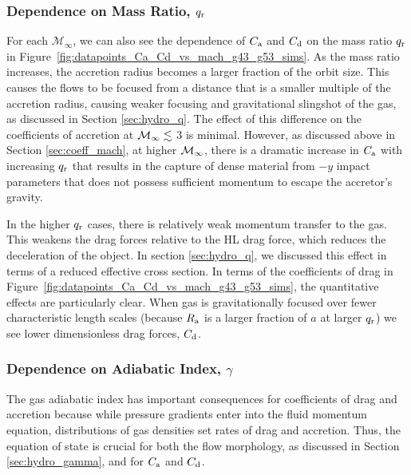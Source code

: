 \subsubsection{Dependence on Mass Ratio, $q_{\rm r}$}\label{sec:coeff_q}

For each $\mathcal{M}_\infty$, we can also see the dependence of $C_{\rm a}$ and $C_{\rm d}$ on the mass ratio $q_{\rm r}$ in Figure~\ref{fig:datapoints_Ca_Cd_vs_mach_g43_g53_sims}. As the mass ratio increases, the accretion radius becomes a larger fraction of the orbit size. This causes the flows to be focused from a distance that is a smaller multiple of the accretion radius, causing weaker focusing and gravitational slingshot of the gas, as discussed in Section \ref{sec:hydro_q}. The effect of this difference on the coefficients of accretion at $\cal{M}_\infty \lesssim$ 3 is minimal. However, as discussed above in Section \ref{sec:coeff_mach},  at higher $\cal{M}_\infty$, there is a dramatic increase in $C_{\rm a}$ with increasing $q_{\rm r}$ that results in the capture of dense material from $-y$ impact parameters that does not possess sufficient momentum to escape the accretor's gravity. 

In the higher $q_{\rm r}$ cases, there is relatively weak momentum transfer to the gas. This weakens the drag forces relative to the HL drag force, which reduces the deceleration of the object. In section \ref{sec:hydro_q}, we discussed this effect in terms of a reduced effective cross section. In terms of the coefficients of drag in Figure~\ref{fig:datapoints_Ca_Cd_vs_mach_g43_g53_sims}, the quantitative effects are particularly clear. When gas is gravitationally focused over fewer characteristic length scales (because $R_{\rm a}$ is a larger fraction of $a$ at larger $q_{\rm r}$) we see lower dimensionless drag forces, $C_{\rm d}$. 

\subsubsection{Dependence on Adiabatic Index, $\gamma$}\label{sec:coeff_gamma}

The gas adiabatic index has important consequences for coefficients of drag and accretion because while pressure gradients enter into the fluid momentum equation, distributions of gas densities set rates of drag and accretion. Thus, the equation of state is crucial for both the flow morphology, as discussed in Section \ref{sec:hydro_gamma}, and for $C_{\rm a}$ and $C_{\rm d}$.

